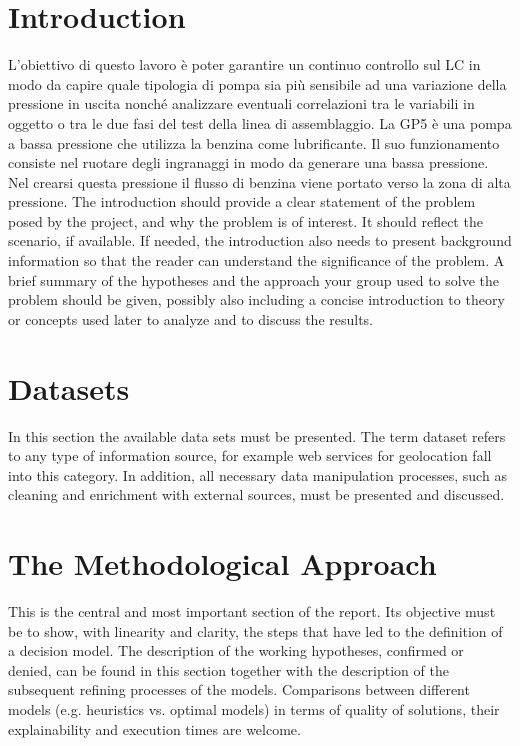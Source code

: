\section{Introduction}
L'obiettivo di questo lavoro è poter garantire un continuo controllo sul LC in modo da capire quale tipologia di pompa sia più sensibile ad una variazione della pressione in uscita nonché analizzare eventuali correlazioni tra le variabili in oggetto o tra le due fasi del test della linea di assemblaggio.
La GP5 è 	una pompa a bassa pressione che utilizza la benzina come lubrificante. Il suo funzionamento consiste nel ruotare degli ingranaggi in modo da generare una bassa pressione. Nel crearsi questa pressione il flusso di benzina viene portato verso la zona di alta pressione.
The introduction should provide a clear statement of the problem posed by the project, and why the problem is of interest. It should reflect the scenario, if available. If needed, the introduction also needs to present background information so that the reader can understand the significance of the problem. A brief summary of the hypotheses and the approach your group used to solve the problem should be given, possibly also including a concise introduction to theory or concepts used later to analyze and to discuss the results.


\section{Datasets}
In this section the available data sets must be presented. The term dataset refers to any type of information source, for example web services for geolocation fall into this category. 
In addition, all necessary data manipulation processes, such as cleaning and enrichment with external sources, must be presented and discussed.

\section{The Methodological Approach}

This is the central and most important section of the report. Its objective must be to show, with linearity and clarity, the steps that have led to the definition of a decision model. The description of the working hypotheses, confirmed or denied, can be found in this section together with the description of the subsequent refining processes of the models. Comparisons between different models (e.g. heuristics vs. optimal models) in terms of quality of solutions, their explainability and execution times are welcome. 

